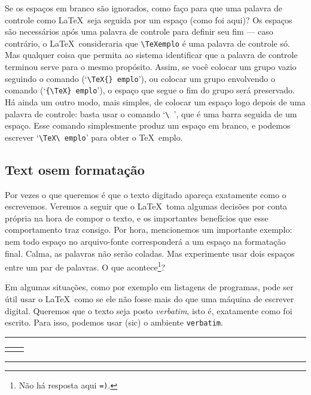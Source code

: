 Se os espaços em branco são ignorados, como faço para que uma palavra
de controle como \LaTeX\ seja seguida por um espaço (como foi aqui)?
Os espaços são necessários após uma palavra de controle para definir
seu fim --- caso contrário, o \LaTeX\ consideraria que \verb'\TeXemplo' é
uma palavra de controle só. Mas qualquer coisa que permita ao sistema
identificar que a palavra de controle terminou serve para o mesmo
propósito. Assim, se você colocar um grupo vazio seguindo o comando
(`\verb'\TeX{} emplo''), ou colocar um grupo envolvendo o comando
(`\verb'{\TeX} emplo''), o espaço que segue o fim do grupo será
preservado. Há ainda um outro modo, mais simples, de colocar um espaço
logo depois de uma palavra de controle: basta usar o comando
`\verb'\ '', que é uma barra seguida de um espaço. Esse comando
simplesmente produz um espaço em branco, e podemos escrever
`\verb'\TeX\ emplo'' para obter o \TeX\ emplo.

\subsection{Text osem formatação}

Por vezes o que queremos é que o texto digitado apareça exatamente
como o escrevemos. Veremos a seguir que o \LaTeX\ toma algumas
decisões por conta própria na hora de compor o texto, e os importantes
benefícios que esse comportamento traz consigo. Por hora, mencionemos
um importante exemplo: nem todo espaço no arquivo-fonte corresponderá
a um espaço na formatação final. Calma, as palavras não serão
coladas. Mas experimente usar dois espaços entre um par de palavras. O
que acontece\footnote{Não há resposta aqui \texttt{=)}.}?

Em algumas situações, como por exemplo em listagens de programas, pode
ser útil usar o \LaTeX\ como se ele não fosse mais do que uma máquina
de escrever digital. Queremos que o texto seja posto
\emph{verbatim}, isto é, exatamente como foi
escrito. Para isso, podemos usar (sic) o ambiente \verb'verbatim'.

\medskip
\begin{center}\footnotesize\hrule\smallskip
\begin{tabular}{c|c}
\begin{minipage}{.465\textwidth}

\end{minipage} &
\begin{minipage}{.465\textwidth}

\end{minipage}
\end{tabular}
\smallskip\hrule
\end{center}
\medskip

